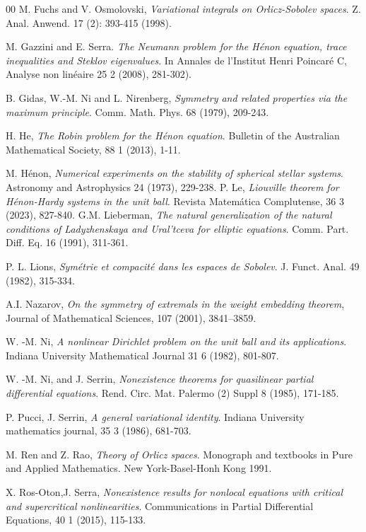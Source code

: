 \documentclass[leqno,twoside, 12pt]{amsart}
\theoremstyle{plain}
\numberwithin{equation}{section} \numberwithin{figure}{section}
\theoremstyle{definition}
\numberwithin{equation}{section}
\begin{document}
\begin{thebibliography}{00}
 M. Fuchs and V. Osmolovski, \emph{Variational integrals on Orlicz-Sobolev spaces}. Z. Anal. Anwend. 17 (2): 393-415 (1998). 

 M. Gazzini and E. Serra. \emph{The Neumann problem for the Hénon equation, trace inequalities and Steklov eigenvalues}. In Annales de l'Institut Henri Poincaré C, Analyse non linéaire 25 2 (2008), 281-302).

 B. Gidas, W.-M. Ni and L. Nirenberg, \emph{Symmetry and related properties via the maximum principle}. Comm. Math. Phys. 68 (1979), 209-243.

H.  He, \emph{The Robin problem for the Hénon equation}. Bulletin of the Australian Mathematical Society, 88 1 (2013), 1-11.
 


 M. H\'enon, \emph{Numerical experiments on the stability of spherical stellar systems}. Astronomy and Astrophysics 24 (1973), 229-238.
 P. Le, \emph{Liouville theorem for Hénon-Hardy systems in the unit ball}. Revista Matemática Complutense, 36 3 (2023), 827-840.
 G.M. Lieberman, \emph{The natural generalization of the natural conditions of Ladyzhenskaya and
Ural'tceva for elliptic equations}. Comm. Part. Diff. Eq. 16 (1991), 311-361.

 P. L. Lions, \emph{Sym\'etrie et compacit\'e dans les espaces de Sobolev}. J. Funct. Anal. 49 (1982), 315-334. 

A.I. Nazarov, \emph{On the symmetry of extremals in the weight embedding theorem}, Journal
of Mathematical Sciences, 107 (2001), 3841–3859.

 W. -M. Ni, \emph{A nonlinear Dirichlet problem on the unit ball and its applications}. Indiana University Mathematical Journal 31 6 (1982), 801-807.

W. -M. Ni, and J. Serrin, \emph{Nonexistence theorems for quasilinear partial differential equations}. Rend. Circ. Mat. Palermo (2) Suppl 8 (1985), 171-185.

P. Pucci, J. Serrin, \emph{A general variational identity}. Indiana University mathematics journal, 35 3 (1986), 681-703.

 M. Ren and Z. Rao, \emph{Theory of Orlicz spaces}. Monograph and textbooks in Pure and Applied Mathematics. New York-Basel-Honh Kong 1991.

X. Ros-Oton,J.   Serra, \emph{Nonexistence results for nonlocal equations with critical and supercritical nonlinearities}. Communications in Partial Differential Equations, 40 1 (2015), 115-133.


\end{thebibliography}
\end{document}
